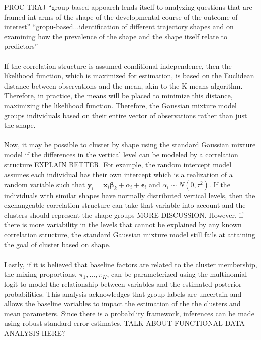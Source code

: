 \documentclass[12pt]{article}
\newcommand{\B}[0]{\mathbf}
\newcommand{\bs}[0]{\boldsymbol}
\begin{document}
PROC TRAJ ``group-based appoarch lends itself to analyzing questions that are framed int arms of the shape of the developmental course of the outcome of interest'' ``gropu-based...identification of different trajectory shapes and on examining how the prevalence of the shape and the shape itself relate to predictors''\\\\
If the correlation structure is assumed conditional independence, then the likelihood function, which is maximized for estimation, is based on the Euclidean distance between observations and the mean, akin to the K-means algorithm. Therefore, in practice, the means will be placed to minimize this distance, maximizing the likelihood function. Therefore, the Gaussian mixture model groups individuals based on their entire vector of observations rather than just the shape. \\\\
Now, it may be possible to cluster by shape using the standard Gaussian mixture model if the differences in the vertical level can be modeled by a correlation structure EXPLAIN BETTER. For example, the random intercept model assumes each individual has their own intercept which is a realization of a random variable such that $\B y_{i} = \B x_{i}\bs\beta_{k} + \alpha_{i}+\bs\epsilon_{i}$ and $\alpha_{i}\sim N(0,\tau^{2})$. If the individuals with similar shapes have normally distributed vertical levels, then the exchangeable correlation structure can take that variable into account and the clusters should represent the shape groups MORE DISCUSSION. However, if there is more variability in the levels that cannot be explained by any known correlation structure, the standard Gaussian mixture model still fails at attaining the goal of cluster based on shape. \\\\
Lastly, if it is believed that baseline factors are related to the cluster membership, the mixing proportions, $\pi_{1},...,\pi_{K}$, can be parameterized using the multinomial logit to model the relationship between variables and the estimated posterior probabilities. This analysis acknowledges that group labels are uncertain and allows the baseline variables to impact the estimation of the the clusters and mean parameters. Since there is a probability framework, inferences can be made using robust standard error estimates.
TALK ABOUT FUNCTIONAL DATA ANALYSIS HERE?
\end{document}

